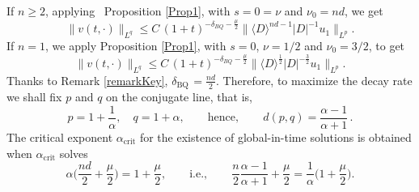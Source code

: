 \documentclass[10pt]{article}
\newcommand{\<}{\langle}
\renewcommand{\>}{\rangle}
\numberwithin{equation}{section}
\newcommand{\BQ}{{\mathrm{BQ\,}}}
\begin{document}
If $n\geq 2$, applying~ Proposition \ref{Prop1}, with $s=0=\nu$ and $\nu_0=nd$, we get
%
\begin{equation*} \label{eq:crucial}
\| v(t, \cdot) \|_{L^q} \leq C\,(1+t)^{-\delta_{BQ}-\frac{\mu}{2}} \|\<D\>^{nd-1}|D|^{-1}u_1\|_{L^p}.
\end{equation*}
  If $n=1$, we apply
Proposition \ref{Prop1}, with $s=0$, $\nu=1/2$ and $\nu_0=3/2$, to get
\begin{equation*}
\| v(t, \cdot) \|_{L^q} \leq C\,(1+t)^{-\delta_{BQ}-\frac{\mu}{2}} \|\<D\>^{\frac12}|D|^{-\frac32}u_1\|_{L^p}.
\end{equation*}
Thanks to Remark \ref{remarkKey},  $\delta_\BQ=\frac{nd}2$.
Therefore, to maximize the decay rate we shall fix $p$ and $q$ on the conjugate line, that is,
\[ p=1+\frac1\alpha, \quad q=1+\alpha, \qquad \text{hence}, \qquad d(p,q)=\frac{\alpha-1}{\alpha+1}\,. \]
The critical exponent $\alpha_{\text{crit}}$ for the existence of global-in-time solutions is obtained when $\alpha_{\text{crit}}$ solves
\begin{equation*} \label{eq:tauStrauss}
\alpha\Big( \frac{nd}2+\frac{\mu}2 \Big)=1+\frac{\mu}2, \qquad \text{i.e.}, \qquad \frac{n}2\frac{\alpha-1}{\alpha+1}+\frac{\mu}{2}=\frac1\alpha\Big( 1+\frac{\mu}{2} \Big).
\end{equation*}
\end{document}
